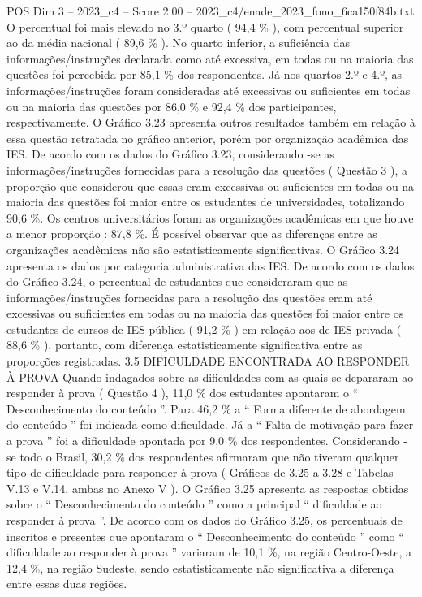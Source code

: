 \begin{textsample}{POS Dim 3 – 2023\_c4 – Score 2.00 – 2023\_c4/enade\_2023\_fono\_6ca150f84b.txt}
O percentual foi mais elevado no 3.º quarto ( 94,4 \% ), com percentual superior ao da média nacional ( 89,6 \% ).
No quarto inferior, a suficiência das informações/instruções declarada como até excessiva, em todas ou na maioria das questões foi percebida por 85,1 \% dos respondentes.
Já nos quartos 2.º e 4.º, as informações/instruções foram consideradas até excessivas ou suficientes em todas ou na maioria das questões por 86,0 \% e 92,4 \% dos participantes, respectivamente.
O Gráfico 3.23 apresenta outros resultados também em relação à essa questão retratada no gráfico anterior, porém por organização acadêmica das IES.
De acordo com os dados do Gráfico 3.23, considerando -se as informações/instruções fornecidas para a resolução das questões ( Questão 3 ), a proporção que considerou que essas eram excessivas ou suficientes em todas ou na maioria das questões foi maior entre os estudantes de universidades, totalizando 90,6 \%.
Os centros universitários foram as organizações acadêmicas em que houve a menor proporção : 87,8 \%.
É possível observar que as diferenças entre as organizações acadêmicas não são estatisticamente significativas.
O Gráfico 3.24 apresenta os dados por categoria administrativa das IES.
De acordo com os dados do Gráfico 3.24, o percentual de estudantes que consideraram que as informações/instruções fornecidas para a resolução das questões eram até excessivas ou suficientes em todas ou na maioria das questões foi maior entre os estudantes de cursos de IES pública ( 91,2 \% ) em relação aos de IES privada ( 88,6 \% ), portanto, com diferença estatisticamente significativa entre as proporções registradas. 3.5 DIFICULDADE ENCONTRADA AO RESPONDER À PROVA Quando indagados sobre as dificuldades com as quais se depararam ao responder à prova ( Questão 4 ), 11,0 \% dos estudantes apontaram o “ Desconhecimento do conteúdo ”.
Para 46,2 \% a “ Forma diferente de abordagem do conteúdo ” foi indicada como dificuldade.
Já a “ Falta de motivação para fazer a prova ” foi a dificuldade apontada por 9,0 \% dos respondentes.
Considerando -se todo o Brasil, 30,2 \% dos respondentes afirmaram que não tiveram qualquer tipo de dificuldade para responder à prova ( Gráficos de 3.25 a 3.28 e Tabelas V.13 e V.14, ambas no Anexo V ).
O Gráfico 3.25 apresenta as respostas obtidas sobre o “ Desconhecimento do conteúdo ” como a principal “ dificuldade ao responder à prova ”.
De acordo com os dados do Gráfico 3.25, os percentuais de inscritos e presentes que apontaram o “ Desconhecimento do conteúdo ” como “ dificuldade ao responder à prova ” variaram de 10,1 \%, na região Centro-Oeste, a 12,4 \%, na região Sudeste, sendo estatisticamente não significativa a diferença entre essas duas regiões.

\end{textsample}
